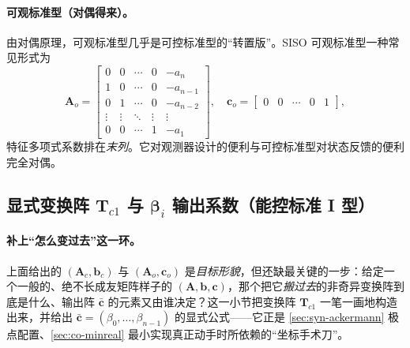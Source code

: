 \paragraph{可观标准型（对偶得来）。}
由对偶原理，可观标准型几乎是可控标准型的“转置版”。SISO 可观标准型一种常见形式为
\begin{equation}
  \mathbf{A}_o=\begin{bmatrix}
    0&0&\cdots&0&-a_n\\
    1&0&\cdots&0&-a_{n-1}\\
    0&1&\cdots&0&-a_{n-2}\\
    \vdots&\vdots&\ddots&\vdots&\vdots\\
    0&0&\cdots&1&-a_1
  \end{bmatrix},\quad
  \mathbf{c}_o=\begin{bmatrix}0&0&\cdots&0&1\end{bmatrix},
  \label{eq:co-ostd}
\end{equation}
特征多项式系数排在\emph{末列}\cite{liubao2006modern}。它对观测器设计的便利与可控标准型对状态反馈的便利完全对偶。

\subsection{显式变换阵 \texorpdfstring{$\mathbf{T}_{c1}$}{Tc1} 与 \texorpdfstring{$\boldsymbol{\beta}_i$}{beta} 输出系数（能控标准 I 型）}
\label{sec:co-canon-transform}

\paragraph{补上“怎么变过去”这一环。}
上面给出的 $(\mathbf{A}_c,\mathbf{b}_c)$ 与 $(\mathbf{A}_o,\mathbf{c}_o)$ 是\emph{目标形貌}，但还缺最关键的一步：给定一个一般的、绝不长成友矩阵样子的 $(\mathbf{A},\mathbf{b},\mathbf{c})$，那个把它\emph{搬过去}的非奇异变换阵到底是什么、输出阵 $\bar{\mathbf{c}}$ 的元素又由谁决定？这一小节把变换阵 $\mathbf{T}_{c1}$ 一笔一画地构造出来，并给出 $\bar{\mathbf{c}}=(\beta_0,\dots,\beta_{n-1})$ 的显式公式——它正是 \cref{sec:syn-ackermann} 极点配置、\cref{sec:co-minreal} 最小实现真正动手时所依赖的“坐标手术刀”。

